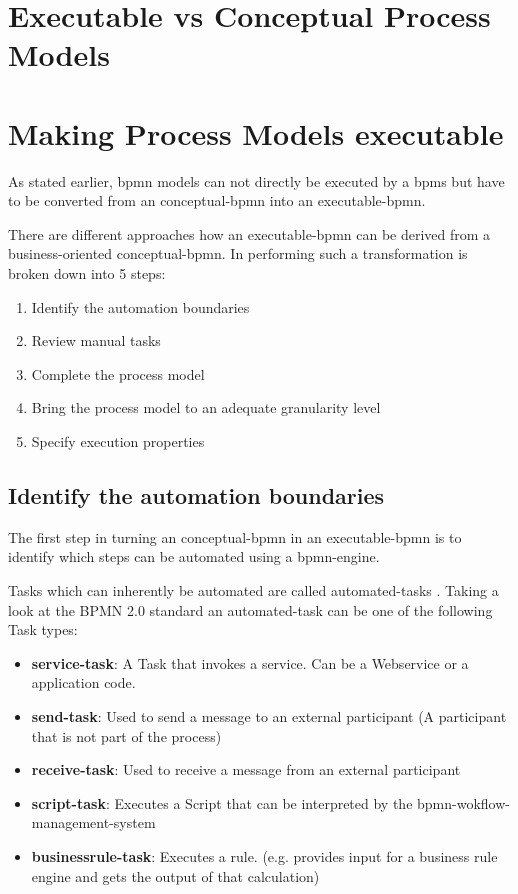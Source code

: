 \section{Executable vs Conceptual Process Models}

\section{Making Process Models executable}
As stated earlier, \gls{bpmn} models can not directly be executed by a \gls{bpms} but have to be converted from an \gls{conceptual-bpmn} into an \gls{executable-bpmn}. 

There are different approaches how an \gls{executable-bpmn} can be derived from a business-oriented \gls{conceptual-bpmn}. In \cite{fundamentals} performing such a transformation is broken down into 5 steps:
\begin{enumerate}
	\item Identify the automation boundaries
	\item Review manual tasks
	\item Complete the process model
	\item Bring the process model to an adequate granularity level
	\item Specify execution properties
\end{enumerate}

\subsection{Identify the automation boundaries}
The first step in turning an \gls{conceptual-bpmn} in an  \gls{executable-bpmn} is to identify which steps can be automated using a \gls{bpmn-engine}. 

Tasks which can inherently be automated are called \gls{automated-task}s \cite[p.~317]{fundamentals}. Taking a look at the BPMN 2.0 standard an \gls{automated-task} can be one of the following Task types:
\begin{itemize}
	\item \textbf{\gls{service-task}}: A Task that invokes a service. Can be a Webservice or a application code.
	\item \textbf{\gls{send-task}}: Used to send a message to an external participant (A participant that is not part of the process)
	\item \textbf{\gls{receive-task}}: Used to receive a message from an external participant
	\item \textbf{\gls{script-task}}: Executes a Script that can be interpreted by the \gls{bpmn-wokflow-management-system}
	\item \textbf{\gls{businessrule-task}}: Executes a rule. (e.g. provides input for a business rule engine and gets the output of that calculation)
\end{itemize}

